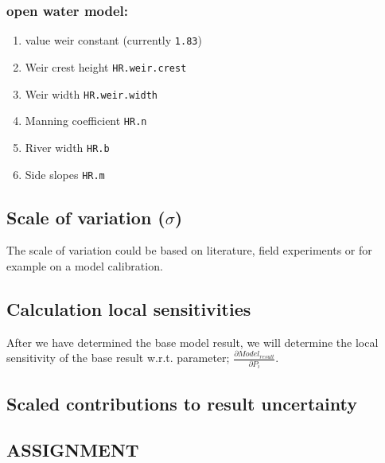\documentclass[
]{article}
\begin{document}
\hypertarget{open-water-model-1}{%
\subsubsection{open water model:}\label{open-water-model-1}}

\begin{enumerate}
\def\labelenumi{\arabic{enumi}.}
\item
  value weir constant (currently \texttt{1.83})
\item
  Weir crest height \texttt{HR.weir.crest}
\item
  Weir width \texttt{HR.weir.width}
\item
  Manning coefficient \texttt{HR.n}
\item
  River width \texttt{HR.b}
\item
  Side slopes \texttt{HR.m}
\end{enumerate}

\hypertarget{scale-of-variation-sigma}{%
\subsection{\texorpdfstring{Scale of variation
(\(\sigma\))}{Scale of variation (\textbackslash sigma)}}\label{scale-of-variation-sigma}}

The scale of variation could be based on literature, field experiments
or for example on a model calibration.

\hypertarget{calculation-local-sensitivities}{%
\subsection{Calculation local
sensitivities}\label{calculation-local-sensitivities}}

After we have determined the base model result, we will determine the
local sensitivity of the base result w.r.t. parameter;
\(\frac{\partial Model_{result}}{\partial P_i}\).

\hypertarget{scaled-contributions-to-result-uncertainty}{%
\subsection{Scaled contributions to result
uncertainty}\label{scaled-contributions-to-result-uncertainty}}

\hypertarget{assignment}{%
\subsection{ASSIGNMENT}\label{assignment}}
\end{document}
